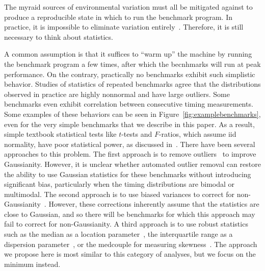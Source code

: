 \documentclass[conference]{IEEEtran}
\begin{document}
The myraid sources of environmental variation must all be mitigated against to
produce a reproducible state in which to run the benchmark program. In practice,
it is impossible to eliminate variation entirely~\cite{Alcocer2015,Barrett2016}.
Therefore, it is still necessary to think about statistics.

A common assumption is that it suffices to ``warm up'' the machine by running
the benchmark program a few times, after which the becnhmarks will run at peak performance.
On the contrary, practically no benchmarks exhibit such simplistic behavior.
Studies of statistics of repeated benchmarks agree that the distributions observed in practice are highly nonnormal and have large outliers. Some benchmarks even exhibit correlation between consecutive
timing measurements.
Some examples of these behaviors can be seen in Figure~\ref{fig:examplebenchmarks},
even for the very simple benchmarks that we describe in this paper.
As a result, simple textbook statistical tests like $t$-tests and $F$-ratios,
which assume iid normality, have poor statistical power, as discussed in~\cite{Mytkowicz2009,Kalibera2013,Chen2015,Barrett2016}.
There have been several approaches to this problem.
The first approach is to remove outliers~\cite{Rehn2015} to improve Gaussianity.
However, it is unclear whether automated outlier removal can restore the ability
to use Gaussian statistics for these benchmarks without introducing significant bias,
particularly when the timing distributions are bimodal or multimodal.
The second approach is to use biased variances to correct for non-Gaussianity~\cite{Mytkowicz2009}.
However, these corrections inherently assume that the statistics are close to Gaussian,
and so there will be benchmarks for which this approach may fail to correct for
non-Gaussianity.
A third approach is to use robust statistics such as the median as a location parameter~\cite{Mytkowicz2009}, the interquartile range as a dispersion parameter~\cite{Mytkowicz2009}, or the medcouple for measuring skewness~\cite{Rehn2015}. The approach we propose here is most similar to this
category of analyses, but we focus on the minimum instead.
\end{document}
